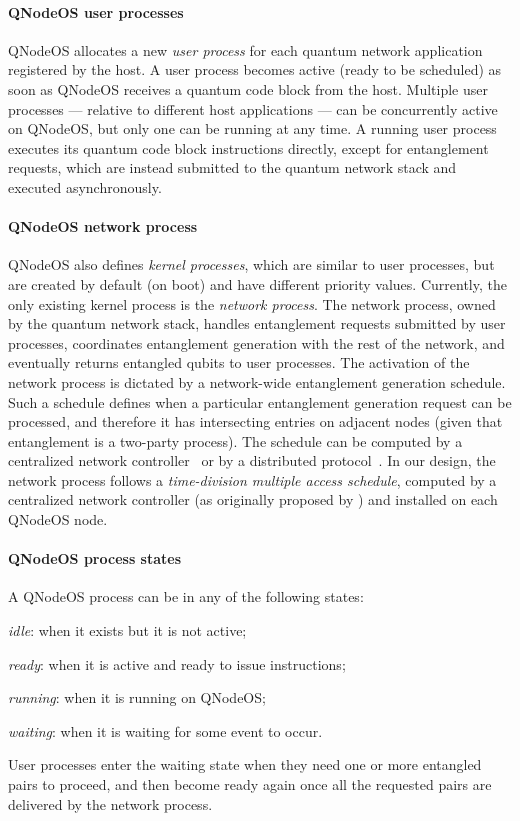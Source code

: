 \paragraph{QNodeOS user processes}

QNodeOS allocates a new \emph{user process} for each quantum network application registered by the
host. A user process becomes active (ready to be scheduled) as soon as QNodeOS receives a quantum
code block from the host. Multiple user processes --- relative to different host applications ---
can be concurrently active on QNodeOS, but only one can be running at any time. A running user
process executes its quantum code block instructions directly, except for entanglement requests,
which are instead submitted to the quantum network stack and executed asynchronously.

\paragraph{QNodeOS network process}

QNodeOS also defines \emph{kernel processes}, which are similar to user processes, but are created
by default (on boot) and have different priority values. Currently, the only existing kernel process
is the \emph{network process}. The network process, owned by the quantum network stack, handles
entanglement requests submitted by user processes, coordinates entanglement generation with the rest
of the network, and eventually returns entangled qubits to user processes. The activation of the
network process is dictated by a network-wide entanglement generation schedule. Such a schedule
defines when a particular entanglement generation request can be processed, and therefore it has
intersecting entries on adjacent nodes (given that entanglement is a two-party process). The
schedule can be computed by a centralized network controller~\cite{skrzypczyk_2021_arch} or by a
distributed protocol~\cite{dahlberg_2019_egp}. In our design, the network process follows a
\emph{time-division multiple access schedule}, computed by a centralized network controller (as
originally proposed by \textcite{skrzypczyk_2021_arch}) and installed on each QNodeOS node.

\paragraph{QNodeOS process states}

A QNodeOS process can be in any of the following states:
%
\begin{enumerate*}[label=(\arabic*)]
    \item \emph{idle}: when it exists but it is not active;
    \item \emph{ready}: when it is active and ready to issue instructions;
    \item \emph{running}: when it is running on QNodeOS;
    \item \emph{waiting}: when it is waiting for some event to occur.
\end{enumerate*}
User processes enter the waiting state when they need one or more entangled pairs to proceed, and
then become ready again once all the requested pairs are delivered by the network process.

